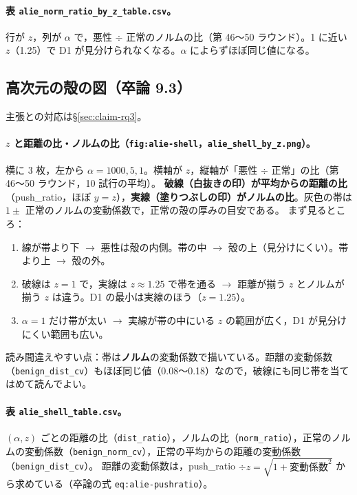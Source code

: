\documentclass[a4j, dvipdfmx]{jsarticle}  %
\begin{document}
\paragraph{表 \texttt{alie\_norm\_ratio\_by\_z\_table.csv}。}
行が $z$，列が $\alpha$ で，悪性 $\div$ 正常のノルムの比（第 46〜50 ラウンド）。1 に近い $z$（1.25）で D1 が見分けられなくなる。$\alpha$ によらずほぼ同じ値になる。

\subsection{高次元の殻の図（卒論 9.3）}
\label{sec:read-shell}

主張との対応は\S\ref{sec:claim-rq3}。

\paragraph{$z$ と距離の比・ノルムの比（\texttt{fig:alie-shell}，\texttt{alie\_shell\_by\_z.png}）。}
横に 3 枚，左から $\alpha = 1000, 5, 1$。横軸が $z$，縦軸が「悪性 $\div$ 正常」の比（第 46〜50 ラウンド，10 試行の平均）。
\textbf{破線（白抜きの印）が平均からの距離の比}（push\_ratio，ほぼ $y = z$），\textbf{実線（塗りつぶしの印）がノルムの比}。灰色の帯は $1 \pm$ 正常のノルムの変動係数で，正常の殻の厚みの目安である。
まず見るところ：
\begin{enumerate}
  \item 線が帯より下 $\rightarrow$ 悪性は殻の内側。帯の中 $\rightarrow$ 殻の上（見分けにくい）。帯より上 $\rightarrow$ 殻の外。
  \item 破線は $z = 1$ で，実線は $z \approx 1.25$ で帯を通る $\rightarrow$ 距離が揃う $z$ とノルムが揃う $z$ は違う。D1 の最小は実線のほう（$z = 1.25$）。
  \item $\alpha = 1$ だけ帯が太い $\rightarrow$ 実線が帯の中にいる $z$ の範囲が広く，D1 が見分けにくい範囲も広い。
\end{enumerate}
読み間違えやすい点：帯は\textbf{ノルム}の変動係数で描いている。距離の変動係数（\texttt{benign\_dist\_cv}）もほぼ同じ値（0.08〜0.18）なので，破線にも同じ帯を当てはめて読んでよい。

\paragraph{表 \texttt{alie\_shell\_table.csv}。}
$(\alpha, z)$ ごとの距離の比（\texttt{dist\_ratio}），ノルムの比（\texttt{norm\_ratio}），正常のノルムの変動係数（\texttt{benign\_norm\_cv}），正常の平均からの距離の変動係数（\texttt{benign\_dist\_cv}）。
距離の変動係数は，push\_ratio $\div z = \sqrt{1 + \text{変動係数}^2}$ から求めている（卒論の式 \texttt{eq:alie-pushratio}）。
\end{document}
